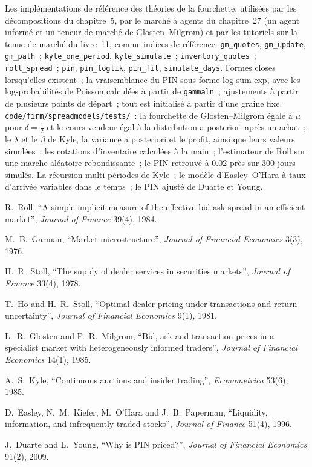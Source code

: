 \begin{build}
 Les implémentations de référence des théories de la fourchette, utilisées par les décompositions du chapitre~5, par le marché à agents du chapitre~27
(un agent informé et un teneur de marché de Glosten--Milgrom) et par les tutoriels sur la tenue de marché du livre~11, comme indices de référence.
 \texttt{gm\_quotes}, \texttt{gm\_update}, \texttt{gm\_path}~; \texttt{kyle\_one\_period}, \texttt{kyle\_simulate}~;
\texttt{inventory\_quotes}~; \texttt{roll\_spread}~; \texttt{pin}, \texttt{pin\_loglik}, \texttt{pin\_fit}, \texttt{simulate\_days}.
 Formes closes lorsqu'elles existent~; la vraisemblance du PIN sous forme log-sum-exp, avec les log-probabilités de Poisson calculées à partir de \texttt{gammaln}~; ajustements à partir de plusieurs
points de départ~; tout est initialisé à partir d'une graine fixe.
 \texttt{code/firm/spreadmodels/tests/}~: la fourchette de Glosten--Milgrom égale à $\mu$ pour $\delta=\tfrac12$ et le cours vendeur égal à la
distribution a posteriori après un achat~; le $\lambda$ et le $\beta$ de Kyle, la variance a posteriori et le profit, ainsi que leurs valeurs simulées~; les cotations d'inventaire calculées à la main~; l'estimateur de Roll sur
une marche aléatoire rebondissante~; le PIN retrouvé à 0.02 près sur 300 jours simulés.
 La récursion multi-périodes de Kyle~; le modèle d'Easley--O'Hara à taux d'arrivée variables dans le temps~; le PIN ajusté de Duarte et Young.
\end{build}

\begin{omsources}
\item R.~Roll, ``A simple implicit measure of the effective bid-ask spread in an efficient market'', \emph{Journal of Finance} 39(4), 1984.
\item M.~B.~Garman, ``Market microstructure'', \emph{Journal of Financial Economics} 3(3), 1976.
\item H.~R.~Stoll, ``The supply of dealer services in securities markets'', \emph{Journal of Finance} 33(4), 1978.
\item T.~Ho and H.~R.~Stoll, ``Optimal dealer pricing under transactions and return uncertainty'', \emph{Journal of Financial Economics} 9(1), 1981.
\item L.~R.~Glosten and P.~R.~Milgrom, ``Bid, ask and transaction prices in a specialist market with heterogeneously informed traders'', \emph{Journal of
Financial Economics} 14(1), 1985.
\item A.~S.~Kyle, ``Continuous auctions and insider trading'', \emph{Econometrica} 53(6), 1985.
\item D.~Easley, N.~M.~Kiefer, M.~O'Hara and J.~B.~Paperman, ``Liquidity, information, and infrequently traded stocks'', \emph{Journal of Finance} 51(4), 1996.
\item J.~Duarte and L.~Young, ``Why is PIN priced?'', \emph{Journal of Financial Economics} 91(2), 2009.
\end{omsources}


